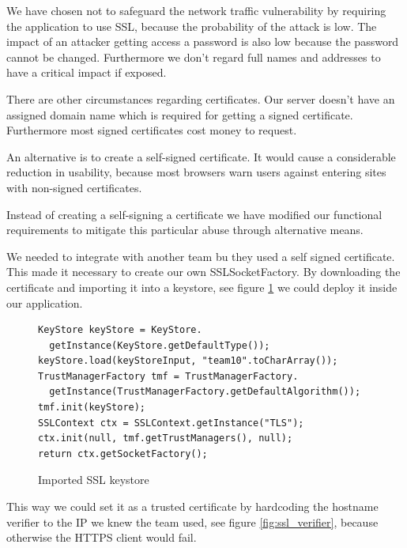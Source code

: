 \documentclass[a4paper]{article}
\begin{document}
We have chosen not to safeguard the network traffic vulnerability by requiring the application to use SSL, because the probability of the attack is low. The impact of an attacker getting access a password is also low because the password cannot be changed. Furthermore we don't regard full names and addresses to have a critical impact if exposed.


There are other circumstances regarding certificates. Our server doesn't have an assigned domain name which is required for getting a signed certificate. Furthermore most signed certificates cost money to request.

An alternative is to create a self-signed certificate. It would cause a considerable reduction in usability, because most browsers warn users against entering sites with non-signed certificates. 

Instead of creating a self-signing a certificate we have modified our functional requirements to mitigate this particular abuse through alternative means.

We needed to integrate with another team bu they used a self signed certificate. This made it necessary to create our own SSLSocketFactory. By downloading the certificate and importing it into a keystore, see figure \ref{fig:ssl_keystore} we could deploy it inside our application. 
\begin{figure}
\caption{Imported SSL keystore}
\label{fig:ssl_keystore}   
\begin{lstlisting}
KeyStore keyStore = KeyStore.
  getInstance(KeyStore.getDefaultType());
keyStore.load(keyStoreInput, "team10".toCharArray());
TrustManagerFactory tmf = TrustManagerFactory.
  getInstance(TrustManagerFactory.getDefaultAlgorithm());
tmf.init(keyStore);
SSLContext ctx = SSLContext.getInstance("TLS");
ctx.init(null, tmf.getTrustManagers(), null);
return ctx.getSocketFactory();
\end{lstlisting}
\end{figure}
This way we could set it as a trusted certificate by hardcoding the hostname verifier to the IP we knew the team used, see figure \ref{fig:ssl_verifier}, because otherwise the HTTPS client would fail.
\end{document}

